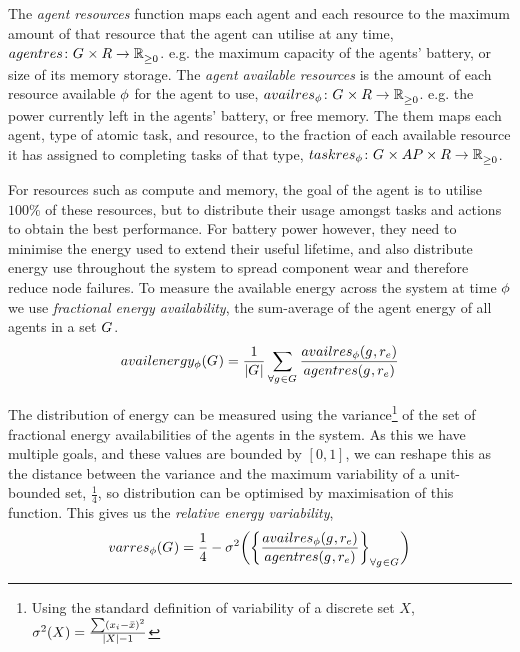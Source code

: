 \newcommand{\functionEnergyVariabilitySymbol}[2]{\functionSymbol{varres_{\varTime{}{}}}{#1}{#2}}
\newcommand{\functionEnergyVariability}[2]{
	\ifx \\#1\\
	\functionSignature{\functionEnergyVariabilitySymbol{}{}}
	{\setAgents{}{}}
	\else
	\functionSignature{\functionEnergyVariabilitySymbol{}{}}{#1}
	\fi
}
The \textit{agent resources} function maps each agent and each resource to the maximum amount of that resource that the agent can utilise at any time, $\formalAgentResources{}{}$. e.g. the maximum capacity of the agents' battery, or size of its memory storage. 
The \textit{agent available resources} is the amount of each resource available $\phi$ for the agent to use, $\formalAgentAvailableResources{}{}$. e.g. the power currently left in the agents' battery, or free memory. The  them maps each agent, type of atomic task, and resource, to the fraction of each available resource it has assigned to completing tasks of that type, $\formalTaskResourceAllocation{}{}$.

For resources such as compute and memory, the goal of the agent is to utilise $100\%$ of these resources, but to distribute their usage amongst tasks and actions to obtain the best performance. For battery power however, they need to minimise the energy used to extend their useful lifetime, and also distribute energy use throughout the system to spread component wear and therefore reduce node failures. To measure the available energy across the system at time $\phi$ we use \textit{fractional energy availability}, the sum-average of the agent energy of all agents in a set $G_{}^{}$.
\begin{equation}
	\functionEnergyAvailable{}{} 
	= \frac{1}{\funcSize{\setAgents{}{}}}
		\sum_{\forall \varAgent{}{} \in \setAgents{}{}} 
		\frac
		{\functionAgentAvailableResourcesEnergy{}{}}
		{\functionAgentResourcesEnergy{}{}}
\end{equation}

The distribution of energy can be measured using the variance\footnote{Using the standard definition of variability of a discrete set $X$, $\sigma^2(X) = \frac{\sum (x_i - \bar{x})^2}{\lvert X \rvert-1}$} of the set of fractional energy availabilities of the agents in the system. As this we have multiple goals, and these values are bounded by $[0, 1]$, we can reshape this as the distance between the variance and the maximum variability of a unit-bounded set, $\frac{1}{4}$, so distribution can be optimised by maximisation of this function. This gives us the \textit{relative energy variability},
\begin{equation}     	
	\functionEnergyVariability{}{} 
	= \frac{1}{4} - \sigma^2 
	\bigg(
	\bigg\lbrace \frac
		{\functionAgentAvailableResourcesEnergy{}{}}
		{\functionAgentResourcesEnergy{}{}}
	\bigg\rbrace_{\forall \varAgent{}{} \in \setAgents{}{}}
	\bigg)
\end{equation}

